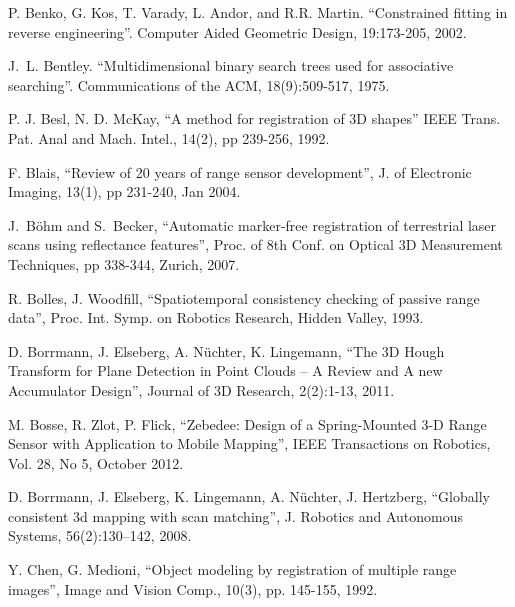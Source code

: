 \documentclass[twocolumn,oneside]{book}
\begin{document}
\begin{thebibliography}{99}
P. Benko, G. Kos, T. Varady, L. Andor, and R.R. Martin.
``Constrained fitting in reverse engineering''. 
Computer Aided Geometric Design, 19:173-205, 2002.

J.~L. Bentley.
``Multidimensional binary search trees used for associative searching''.
Communications of the ACM, 18(9):509-517, 1975.


P. J. Besl, N. D. McKay,
``A method for registration of 3D shapes''
IEEE Trans. Pat. Anal and Mach. Intel., 14(2), pp 239-256, 1992.

F. Blais,
``Review of 20 years of range sensor development'',
J. of Electronic Imaging, 13(1), pp 231-240, Jan 2004.

J.~B{\"o}hm and S.~Becker,
``Automatic marker-free registration of terrestrial laser scans using reflectance features'',
Proc. of 8th Conf. on Optical 3D Measurement
  Techniques, pp 338-344, Zurich, 2007.

R. Bolles, J. Woodfill, 
``Spatiotemporal consistency checking of passive range data'',  
Proc. Int. Symp. on Robotics Research, Hidden Valley, 1993.

D. Borrmann, J. Elseberg, A. N{\"u}chter, K. Lingemann,
``The 3D Hough Transform for Plane Detection in Point Clouds -- A Review and A new Accumulator Design'',
Journal of 3D Research, 2(2):1-13, 2011.

M. Bosse, R. Zlot, P. Flick,
``Zebedee: Design of a Spring-Mounted 3-D Range
Sensor with Application to Mobile Mapping'',
IEEE Transactions on Robotics, Vol. 28, No 5, October 2012.

D. Borrmann, J. Elseberg, K. Lingemann, A. N{\"u}chter, J. Hertzberg,
``Globally consistent 3d mapping with scan matching'',
J. Robotics and Autonomous Systems, 56(2):130–142, 2008.

Y. Chen, G. Medioni,
``Object modeling by registration of multiple range images'',
Image and Vision Comp., 10(3), pp. 145-155, 1992.



\end{thebibliography}
\end{document}
